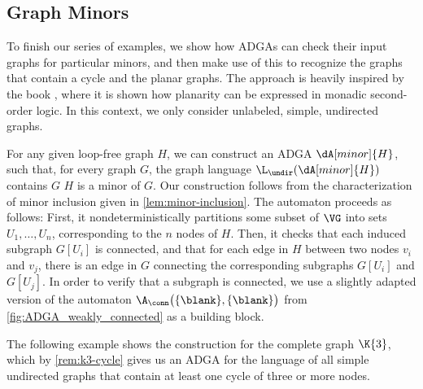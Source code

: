 \documentclass[a4paper,11pt,twoside]{report} \pdfoutput=1
\begin{document}
\subsection*{Graph Minors}
To finish our series of examples, we show how ADGAs can check their
input graphs for particular minors, and then make use of this to
recognize the graphs that contain a cycle and the planar graphs. The
approach is heavily inspired by the book \cite{CE12}, where it is
shown how planarity can be expressed in monadic second-order logic. In
this context, we only consider unlabeled, simple, undirected graphs.

For any given loop-free graph $H$, we can construct an ADGA
$\dA[minor]{H}$, such that, for every graph $G$, the graph language
$\L_\undir(\dA[minor]{H})$ contains $G$ \Iff $H$ is a minor of
$G$. Our construction follows from the characterization of minor
inclusion given in \cref{lem:minor-inclusion}. The automaton proceeds
as follows: First, it nondeterministically partitions some subset of
$\VG$ into sets $U_1,…,U_n$, corresponding to the $n$ nodes of
$H$. Then, it checks that each induced subgraph $G[U_i]$ is connected,
and that for each edge in $H$ between two nodes $v_i$ and $v_j$, there
is an edge in $G$ connecting the corresponding subgraphs $G[U_i]$ and
$G[U_j]$. In order to verify that a subgraph is connected, we use a
slightly adapted version of the automaton
$\A_\conn\bigl(\{\blank\},\{\blank\}\bigr)$ from
\cref{fig:ADGA_weakly_connected} as a building block.

The following example shows the construction for the complete graph
$\K{3}$, which by \cref{rem:k3-cycle} gives us an ADGA for the
language of all simple undirected graphs that contain at least one
cycle of three or more nodes.
\end{document}
